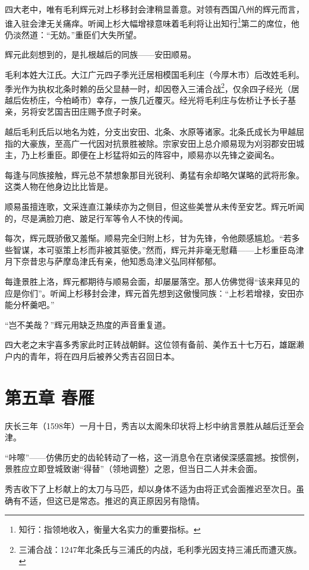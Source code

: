 \documentclass[
]{article}
\begin{document}
四大老中，唯有毛利辉元对上杉移封会津稍显善意。对领有西国八州的辉元而言，谁入驻会津无关痛痒。听闻上杉大幅增禄意味着毛利将让出知行\footnote{知行：指领地收入，衡量大名实力的重要指标。}第二的席位，他仍淡然道：``无妨。''重臣们大失所望。

辉元此刻想到的，是扎根越后的同族------安田顺易。

毛利本姓大江氏。大江广元四子季光迁居相模国毛利庄（今厚木市）后改姓毛利。季光作为执权北条时赖的岳父显赫一时，却因卷入三浦合战\footnote{三浦合战：1247年北条氏与三浦氏的内战，毛利季光因支持三浦氏而遭灭族。}，仅余四子经光（居越后佐桥庄，今柏崎市）幸存，一族几近覆灭。经光将毛利庄与佐桥让予长子基亲，另将安艺国吉田庄赐予庶子时亲。

越后毛利氏后以地名为姓，分支出安田、北条、水原等诸家。北条氏成长为甲越屈指的大豪族，至高广一代因对抗景胜被除。宗家安田上总介顺易现为刈羽郡安田城主，乃上杉重臣。即便在上杉猛将如云的阵容中，顺易亦以先锋之姿闻名。

每逢与同族接触，辉元总不禁想象那目光锐利、勇猛有余却略欠谋略的武将形象。这类人物在他身边比比皆是。

顺易虽擅连歌，文采连直江兼续亦为之侧目，但这些美誉从未传至安艺。辉元听闻的，尽是满脸刀疤、跛足行军等令人不快的传闻。

每次，辉元既骄傲又羞惭。顺易完全归附上杉，甘为先锋，令他颇感尴尬。``若多些智谋，本可驱策上杉而非被其驱使。''然而，辉元并非毫无慰藉------上杉重臣岛津月下奈昔忠与萨摩岛津氏有亲，他知悉岛津义弘同样郁郁。

每逢景胜上洛，辉元都期待与顺易会面，却屡屡落空。那人仿佛觉得``该来拜见的应是你们''。听闻上杉移封会津，辉元首先想到这傲慢同族：``上杉若增禄，安田亦能分杯羹吧。''

``岂不美哉？''辉元用缺乏热度的声音重复道。

四大老之末宇喜多秀家此时正转战朝鲜。这位领有备前、美作五十七万石，雄踞濑户内的青年，将在四月后被养父秀吉召回日本。

\section*{第五章 春雁}\label{ux7b2cux4e94ux7ae0-ux6625ux96c1}

庆长三年（1598年）一月十日，秀吉以太阁朱印状将上杉中纳言景胜从越后迁至会津。

``咔嚓''------仿佛历史的齿轮转动了一格，这一消息令在京诸侯深感震撼。按惯例，景胜应立即登城致谢``得替''（领地调整）之恩，但当日二人并未会面。

秀吉收下了上杉献上的太刀与马匹，却以身体不适为由将正式会面推迟至次日。虽确有不适，但这已是常态。推迟的真正原因另有隐情。
\end{document}
